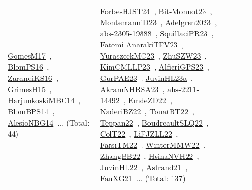 {\begin{longtable}{lp{3cm}>{\raggedright\arraybackslash}p{6cm}>{\raggedright\arraybackslash}p{6cm}>{\raggedright\arraybackslash}p{8cm}}
\href{../works/GomesM17.pdf}{GomesM17}~\cite{GomesM17}, \href{../works/BlomPS16.pdf}{BlomPS16}~\cite{BlomPS16}, \href{../works/ZarandiKS16.pdf}{ZarandiKS16}~\cite{ZarandiKS16}, \href{../works/GrimesH15.pdf}{GrimesH15}~\cite{GrimesH15}, \href{../works/HarjunkoskiMBC14.pdf}{HarjunkoskiMBC14}~\cite{HarjunkoskiMBC14}, \href{../works/BlomBPS14.pdf}{BlomBPS14}~\cite{BlomBPS14}, \href{../works/AlesioNBG14.pdf}{AlesioNBG14}~\cite{AlesioNBG14}... (Total: 44) & \href{../works/ForbesHJST24.pdf}{ForbesHJST24}~\cite{ForbesHJST24}, \href{../works/Bit-Monnot23.pdf}{Bit-Monnot23}~\cite{Bit-Monnot23}, \href{../works/MontemanniD23.pdf}{MontemanniD23}~\cite{MontemanniD23}, \href{../works/Adelgren2023.pdf}{Adelgren2023}~\cite{Adelgren2023}, \href{../works/abs-2305-19888.pdf}{abs-2305-19888}~\cite{abs-2305-19888}, \href{../works/SquillaciPR23.pdf}{SquillaciPR23}~\cite{SquillaciPR23}, \href{../works/Fatemi-AnarakiTFV23.pdf}{Fatemi-AnarakiTFV23}~\cite{Fatemi-AnarakiTFV23}, \href{../works/YuraszeckMC23.pdf}{YuraszeckMC23}~\cite{YuraszeckMC23}, \href{../works/ZhuSZW23.pdf}{ZhuSZW23}~\cite{ZhuSZW23}, \href{../works/KimCMLLP23.pdf}{KimCMLLP23}~\cite{KimCMLLP23}, \href{../works/AlfieriGPS23.pdf}{AlfieriGPS23}~\cite{AlfieriGPS23}, \href{../works/GurPAE23.pdf}{GurPAE23}~\cite{GurPAE23}, \href{../works/JuvinHL23a.pdf}{JuvinHL23a}~\cite{JuvinHL23a}, \href{../works/AkramNHRSA23.pdf}{AkramNHRSA23}~\cite{AkramNHRSA23}, \href{../works/abs-2211-14492.pdf}{abs-2211-14492}~\cite{abs-2211-14492}, \href{../works/EmdeZD22.pdf}{EmdeZD22}~\cite{EmdeZD22}, \href{../works/NaderiBZ22.pdf}{NaderiBZ22}~\cite{NaderiBZ22}, \href{../works/TouatBT22.pdf}{TouatBT22}~\cite{TouatBT22}, \href{../works/Teppan22.pdf}{Teppan22}~\cite{Teppan22}, \href{../works/BoudreaultSLQ22.pdf}{BoudreaultSLQ22}~\cite{BoudreaultSLQ22}, \href{../works/ColT22.pdf}{ColT22}~\cite{ColT22}, \href{../works/LiFJZLL22.pdf}{LiFJZLL22}~\cite{LiFJZLL22}, \href{../works/FarsiTM22.pdf}{FarsiTM22}~\cite{FarsiTM22}, \href{../works/WinterMMW22.pdf}{WinterMMW22}~\cite{WinterMMW22}, \href{../works/ZhangBB22.pdf}{ZhangBB22}~\cite{ZhangBB22}, \href{../works/HeinzNVH22.pdf}{HeinzNVH22}~\cite{HeinzNVH22}, \href{../works/JuvinHL22.pdf}{JuvinHL22}~\cite{JuvinHL22}, \href{../works/Astrand21.pdf}{Astrand21}~\cite{Astrand21}, \href{../works/FanXG21.pdf}{FanXG21}~\cite{FanXG21}... (Total: 137)\\

\end{longtable}}
